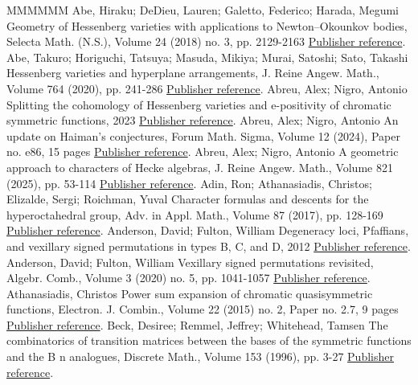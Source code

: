 \begin{thebibliography}{MMMMMM}
 Abe, Hiraku; DeDieu, Lauren; Galetto, Federico; Harada, Megumi Geometry of Hessenberg varieties with applications to Newton–Okounkov bodies, Selecta Math. (N.S.), Volume 24 (2018) no. 3, pp. 2129-2163 \href{https://alco.centre-mersenne.org/articles/10.5802/alco.459/#ADGHGeoHess}{Publisher reference}.
 Abe, Takuro; Horiguchi, Tatsuya; Masuda, Mikiya; Murai, Satoshi; Sato, Takashi Hessenberg varieties and hyperplane arrangements, J. Reine Angew. Math., Volume 764 (2020), pp. 241-286 \href{https://alco.centre-mersenne.org/articles/10.5802/alco.459/#AHMMSHess}{Publisher reference}.
 Abreu, Alex; Nigro, Antonio Splitting the cohomology of Hessenberg varieties and e-positivity of chromatic symmetric functions, 2023 \href{https://alco.centre-mersenne.org/articles/10.5802/alco.459/#ANigroSplit}{Publisher reference}.
 Abreu, Alex; Nigro, Antonio An update on Haiman’s conjectures, Forum Math. Sigma, Volume 12 (2024), Paper no. e86, 15 pages \href{https://alco.centre-mersenne.org/articles/10.5802/alco.459/#ANigroUpdate}{Publisher reference}.
 Abreu, Alex; Nigro, Antonio A geometric approach to characters of Hecke algebras, J. Reine Angew. Math., Volume 821 (2025), pp. 53-114 \href{https://alco.centre-mersenne.org/articles/10.5802/alco.459/#ANigroGeoAppro}{Publisher reference}.
 Adin, Ron; Athanasiadis, Christos; Elizalde, Sergi; Roichman, Yuval Character formulas and descents for the hyperoctahedral group, Adv. in Appl. Math., Volume 87 (2017), pp. 128-169 \href{https://alco.centre-mersenne.org/articles/10.5802/alco.459/#AAERCharFormulasHyper}{Publisher reference}.
 Anderson, David; Fulton, William Degeneracy loci, Pfaffians, and vexillary signed permutations in types B, C, and D, 2012 \href{https://alco.centre-mersenne.org/articles/10.5802/alco.459/#AFultonDLoci}{Publisher reference}.
 Anderson, David; Fulton, William Vexillary signed permutations revisited, Algebr. Comb., Volume 3 (2020) no. 5, pp. 1041-1057 \href{https://alco.centre-mersenne.org/articles/10.5802/alco.459/#AFultonVexRevisited}{Publisher reference}.
 Athanasiadis, Christos Power sum expansion of chromatic quasisymmetric functions, Electron. J. Combin., Volume 22 (2015) no. 2, Paper no. 2.7, 9 pages \href{https://alco.centre-mersenne.org/articles/10.5802/alco.459/#AthanPSE}{Publisher reference}.
 Beck, Desiree; Remmel, Jeffrey; Whitehead, Tamsen The combinatorics of transition matrices between the bases of the symmetric functions and the B n  analogues, Discrete Math., Volume 153 (1996), pp. 3-27 \href{https://alco.centre-mersenne.org/articles/10.5802/alco.459/#RemTrans}{Publisher reference}.

\end{thebibliography}

